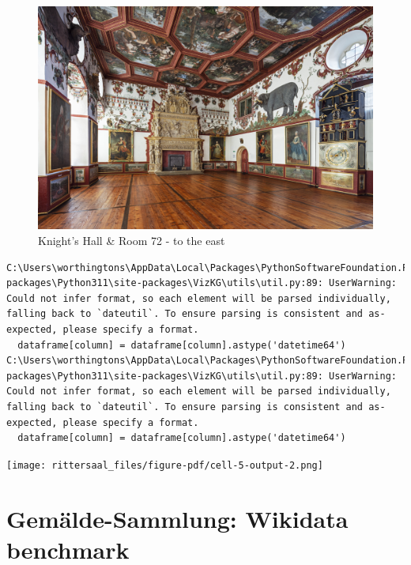 \documentclass[
  letterpaper,
]{book}
\begin{document}
\begin{figure}[H]

{\centering \includegraphics{impressum_files/mediabag/fmd10005860a.jpg}

}

\caption{Knight's Hall \& Room 72 - to the east}

\end{figure}%

\begin{verbatim}
C:\Users\worthingtons\AppData\Local\Packages\PythonSoftwareFoundation.Python.3.11_qbz5n2kfra8p0\LocalCache\local-packages\Python311\site-packages\VizKG\utils\util.py:89: UserWarning: Could not infer format, so each element will be parsed individually, falling back to `dateutil`. To ensure parsing is consistent and as-expected, please specify a format.
  dataframe[column] = dataframe[column].astype('datetime64')
C:\Users\worthingtons\AppData\Local\Packages\PythonSoftwareFoundation.Python.3.11_qbz5n2kfra8p0\LocalCache\local-packages\Python311\site-packages\VizKG\utils\util.py:89: UserWarning: Could not infer format, so each element will be parsed individually, falling back to `dateutil`. To ensure parsing is consistent and as-expected, please specify a format.
  dataframe[column] = dataframe[column].astype('datetime64')
\end{verbatim}

\texttt{[image: rittersaal\_files/figure-pdf/cell-5-output-2.png]}


\chapter{Gemälde-Sammlung: Wikidata
benchmark}\label{gemuxe4lde-sammlung-wikidata-benchmark}
\end{document}
